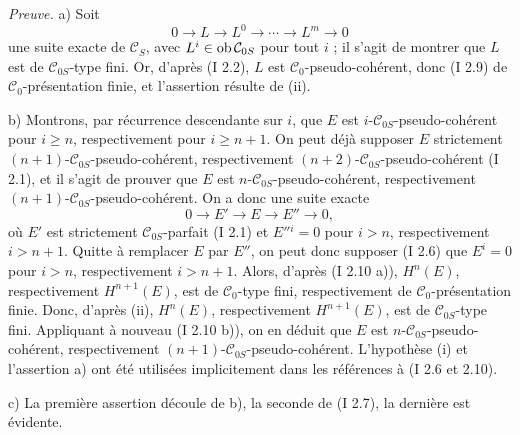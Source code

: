 \documentclass[11pt]{article}
\begin{document}
\emph{Preuve.} a) Soit
\[
0\longrightarrow L\longrightarrow L^0\longrightarrow\cdots\longrightarrow L^m\longrightarrow0
\]
une suite exacte de $\mathcal C_S$, avec $L^i\in\operatorname{ob}\mathcal C_{0S}$ pour tout $i$ ; il s'agit de montrer que $L$ est de $\mathcal C_{0S}$-type fini. Or, d'après (I 2.2), $L$ est $\mathcal C_0$-pseudo-cohérent, donc (I 2.9) de $\mathcal C_0$-présentation finie, et l'assertion résulte de (ii).

b) Montrons, par récurrence descendante sur $i$, que $E$ est $i$-$\mathcal C_{0S}$-pseudo-cohérent pour $i\ge n$, respectivement pour $i\ge n+1$. On peut déjà supposer $E$ strictement $(n+1)$-$\mathcal C_{0S}$-pseudo-cohérent, respectivement $(n+2)$-$\mathcal C_{0S}$-pseudo-cohérent (I 2.1), et il s'agit de prouver que $E$ est $n$-$\mathcal C_{0S}$-pseudo-cohérent, respectivement $(n+1)$-$\mathcal C_{0S}$-pseudo-cohérent. On a donc une suite exacte
\[
0\longrightarrow E'\longrightarrow E\longrightarrow E''\longrightarrow0,
\]
où $E'$ est strictement $\mathcal C_{0S}$-parfait (I 2.1) et $E''{}^i=0$ pour $i>n$, respectivement $i>n+1$. Quitte à remplacer $E$ par $E''$, on peut donc supposer (I 2.6) que $E^i=0$ pour $i>n$, respectivement $i>n+1$. Alors, d'après (I 2.10 a)), $H^n(E)$, respectivement $H^{n+1}(E)$, est de $\mathcal C_0$-type fini, respectivement de $\mathcal C_0$-présentation finie. Donc, d'après (ii), $H^n(E)$, respectivement $H^{n+1}(E)$, est de $\mathcal C_{0S}$-type fini. Appliquant à nouveau (I 2.10 b)), on en déduit que $E$ est $n$-$\mathcal C_{0S}$-pseudo-cohérent, respectivement $(n+1)$-$\mathcal C_{0S}$-pseudo-cohérent. L'hypothèse (i) et l'assertion a) ont été utilisées implicitement dans les références à (I 2.6 et 2.10).

c) La première assertion découle de b), la seconde de (I 2.7), la dernière est évidente.
\end{document}

